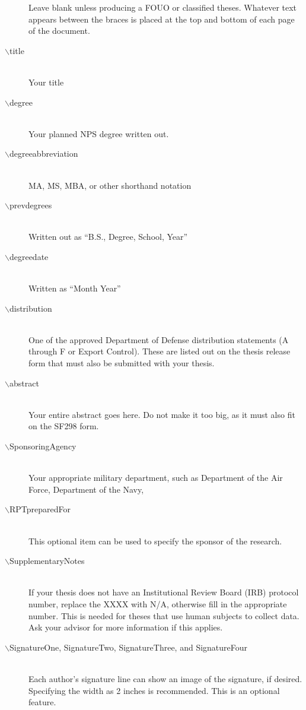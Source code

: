 \begin{description}
  Leave blank unless producing a FOUO or classified theses.  Whatever text appears 
  between the braces is placed
  at the top and bottom of each page of the document.
  \item[$\backslash$title]  \hfill \\ Your title 
  \item[$\backslash$degree] \hfill \\  Your planned NPS degree written out.
  \item[$\backslash$degreeabbreviation] \hfill \\   MA, MS, MBA, or other shorthand notation
  \item[$\backslash$prevdegrees] \hfill \\   Written out as ``B.S., Degree, School, Year'' 
  \item[$\backslash$degreedate] \hfill \\   Written as ``Month Year'' 
  \item[$\backslash$distribution] \hfill \\
  One of the approved Department of Defense distribution statements 
  (A through F or Export Control).  These are
  listed out on the thesis release form that must also be submitted 
  with your thesis.
  \item[$\backslash$abstract] \hfill \\
  Your entire abstract goes here.  
  Do not make it too big, as it must also fit on the SF298 form.
  \item[$\backslash$SponsoringAgency] \hfill \\
  Your appropriate military department, such as Department of the 
  Air Force, Department of the Navy, \etc
  \item[$\backslash$RPTpreparedFor] \hfill \\
  This optional item can be used to specify the sponsor of the research.
  \item[$\backslash$SupplementaryNotes] \hfill \\
  If your thesis does not have an Institutional Review Board (IRB) protocol 
  number, replace the XXXX with N/A, otherwise fill in 
  the appropriate number.  
  This is needed for theses that use human subjects to collect data.  
  Ask your advisor for more information if this applies. 
  \item[$\backslash$SignatureOne, SignatureTwo, SignatureThree, and SignatureFour] \hfill \\
  Each author's signature line can show an image of the signature, if desired.
  Specifying the width as 2 inches is recommended.  This is an 
  optional feature. 
\end{description}

